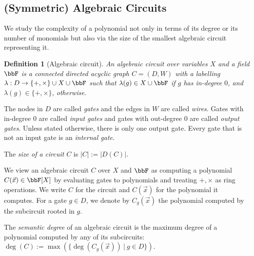 \documentclass[10pt,a4paper]{article}
\newtheorem{definition}[theorem]{Definition}
\newcommand{\defset}[2]{\ensuremath{\{ #1 ~|~  #2 \}}}
\newcommand{\Circ}{C} %
\begin{document}
	
	\subsection{(Symmetric) Algebraic Circuits}
	\label{sec:circuits}
	We study the complexity of a polynomial not only in terms of its degree or its number of monomials but also via the size of the smallest algebraic circuit representing it. 
	\begin{definition}[Algebraic circuit]
		An \textit{algebraic circuit} over variables $X$ and a field $\bbF$ is
		a connected directed acyclic graph $\Circ = (D,W)$ with a labelling
		$\lambda: D \rightarrow \{+,\times \} \cup X \cup \bbF$ 
		such that $\lambda(g) \in X \cup \bbF$ if $g$ has in-degree $0$, and $\lambda(g) \in \{+,\times\}$, otherwise.
	\end{definition}
	The nodes in $D$ are called \textit{gates} and the edges in $W$ are called \textit{wires}.
	Gates with in-degree $0$ are called \textit{input gates} and gates with out-degree $0$
	are called \textit{output gates}. Unless stated otherwise,
	there is only one output gate.
	Every gate that is not an input gate is an \textit{internal gate}.

	The \textit{size of a circuit} $\Circ$ is
	$|\Circ| := |D(\Circ)|$.
	

	
	We view an algebraic circuit $\Circ$ over $X$ and $\bbF$ as computing
	a polynomial $\Circ(\vec x) \in \bbF[X]$ by evaluating gates to polynomials and treating
	$+, \times$ as ring operations. We write $C$ for the circuit and $C(\vec x)$ for the polynomial it computes. For a gate $g \in D$, we denote by $C_g(\vec x)$ the polynomial computed by the subcircuit rooted in $g$.
	
	
	The \textit{semantic degree} of an algebraic circuit is the maximum degree of a polynomial computed by any of its subcircuits:
	$\deg (\Circ) := \max(\defset{\deg(\Circ_g(\vec x))}{g \in D}).$
	
\end{document}
